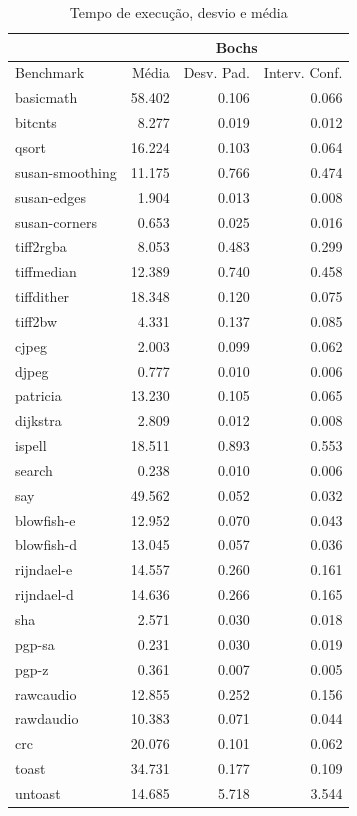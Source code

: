 \documentclass[11pt,twoside]{article}
\begin{document}
\begin{table}
 \caption{Tempo de execução, desvio e média}
 \begin{center}
 \begin{tabular}{|l|r|r|r|}
   \cline{2-4}
   \multicolumn{1}{c|}{}& \multicolumn{3}{|c|}{Bochs} \\ \hline
   Benchmark & Média & Desv. Pad. & Interv. Conf.\\ \hline 
   basicmath & 58.402 & 0.106 & 0.066\\ \hline 
   bitcnts & 8.277 & 0.019 & 0.012\\ \hline 
   qsort & 16.224 & 0.103 & 0.064\\ \hline 
   susan-smoothing & 11.175 & 0.766 & 0.474\\ \hline 
   susan-edges & 1.904 & 0.013 & 0.008\\ \hline 
   susan-corners & 0.653 & 0.025 & 0.016\\ \hline 
   tiff2rgba & 8.053 & 0.483 & 0.299\\ \hline 
   tiffmedian & 12.389 & 0.740 & 0.458\\ \hline 
   tiffdither & 18.348 & 0.120 & 0.075\\ \hline 
   tiff2bw & 4.331 & 0.137 & 0.085\\ \hline 
   cjpeg & 2.003 & 0.099 & 0.062\\ \hline 
   djpeg & 0.777 & 0.010 & 0.006\\ \hline 
   patricia & 13.230 & 0.105 & 0.065\\ \hline 
   dijkstra & 2.809 & 0.012 & 0.008\\ \hline 
   ispell & 18.511 & 0.893 & 0.553\\ \hline 
   search & 0.238 & 0.010 & 0.006\\ \hline 
   say & 49.562 & 0.052 & 0.032\\ \hline 
   blowfish-e & 12.952 & 0.070 & 0.043\\ \hline 
   blowfish-d & 13.045 & 0.057 & 0.036\\ \hline 
   rijndael-e & 14.557 & 0.260 & 0.161\\ \hline 
   rijndael-d & 14.636 & 0.266 & 0.165\\ \hline 
   sha & 2.571 & 0.030 & 0.018\\ \hline 
   pgp-sa & 0.231 & 0.030 & 0.019\\ \hline 
   pgp-z & 0.361 & 0.007 & 0.005\\ \hline 
   rawcaudio & 12.855 & 0.252 & 0.156\\ \hline 
   rawdaudio & 10.383 & 0.071 & 0.044\\ \hline 
   crc & 20.076 & 0.101 & 0.062\\ \hline 
   toast & 34.731 & 0.177 & 0.109\\ \hline 
   untoast & 14.685 & 5.718 & 3.544\\
   \hline
 \end{tabular}
 \label{tab:tempos_bochs}
 \end{center}
\end{table}
\end{document}
